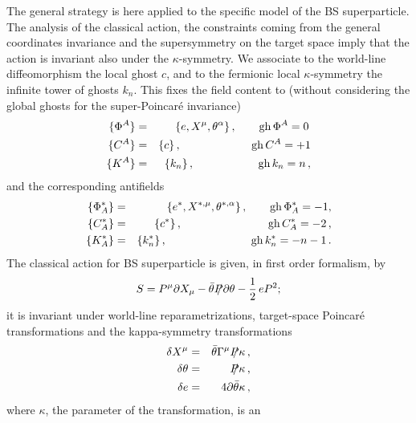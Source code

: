 \documentclass[a4paper,12pt]{article}
\begin{document}
The general strategy is here applied to the specific model of 
the BS superparticle.  
The analysis of the classical action, the constraints coming from
the general coordinates invariance and the
supersymmetry on the target space  imply that the action is invariant
also under the $\kappa$-symmetry.  
We associate to  the world-line diffeomorphism the local ghost  
$c$, and  to the fermionic local $\kappa$-symmetry 
the infinite tower of ghosts $k_{n}$. 
This fixes the field content to (without considering the global ghosts
for the  super-Poincar\'e invariance)  
\begin{eqnarray}
  \label{eq:no_2}
  \{ \Phi^A \} &=& \{ e, X^\mu,  \theta^\alpha \}\,, ~~~~~~ {\rm gh}\,
  \Phi^A = 0  \,\nonumber \\ 
  \{ C^A \} &=& \{ c \}\,, \hspace{2.2cm} {\rm gh}\, C^A = +1 \nonumber \\
  \{ K^A \} &=&  \{ k_{n} \} \,, \hspace{2cm} {\rm gh}\, k_n = n \,,
\end{eqnarray}
and the corresponding antifields
\begin{eqnarray}
  \label{eq:no_3}
  \{ \Phi^{*}_A \} &=& \{ e^{*}, X^{*,\mu}, \theta^{*,\alpha} \}\,,
  ~~~~~~ {\rm gh}\, \Phi^*_A = - 1 , \nonumber \\ 
  \{ C^{*}_A \} &=& \{ c^{*} \}\,, \hspace{2.7cm}  {\rm gh}\, C^*_A = - 2
  \,, \nonumber \\ 
   \{ K^*_A \} &=&  \{ k^{*}_{n} \}\,,  \hspace{2.65cm} {\rm gh}\, k^*_n =
   - n -1 \,. 
\end{eqnarray}
 The classical action for BS superparticle \cite{Brink-Schwarz} is
 given, in first order formalism, by 
 \begin{equation}
   S = P^\mu \partial X_\mu - \bar\theta \SL{P} \partial\theta -{1
     \over 2}\, e 
   P^2 ; 
 \end{equation}
it is invariant under world-line reparametrizations, target-space
Poincar\'e transformations and the kappa-symmetry transformations 
\begin{eqnarray}
\delta X^\mu & = & \bar \theta \Gamma^\mu \SL{P} \kappa\,, \\
\delta \theta& = & \SL{P} \kappa\,, \nonumber \\
\delta e     & = & 4 \partial\bar\theta \kappa \,,\nonumber 
\end{eqnarray}
where $\kappa$, the parameter of the transformation, is an
\end{document}
